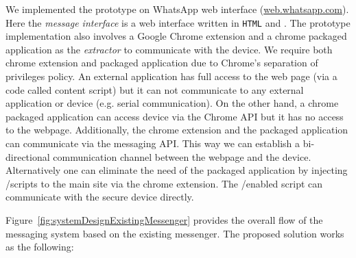 We implemented the prototype on WhatsApp web interface (\url{web.whatsapp.com}). Here the \emph{message interface} is a web interface written in \texttt{HTML} and \js. The prototype implementation also involves a Google Chrome extension and a chrome packaged application as the \emph{extractor} to communicate with the \usb device. We require both chrome extension and packaged application due to Chrome's separation of privileges policy. An external application has full access to the web page (via a \js code called content script) but it can not communicate to any external application or device (e.g. serial communication). On the other hand, a chrome packaged application can access \usb device via the Chrome \serial API but it has no access to the webpage. Additionally, the chrome extension and the packaged application can communicate via the messaging API. This way we can establish a bi-directional communication channel between the webpage and the \usb device. Alternatively one can eliminate the need of the packaged application by injecting \webusb/\webbt scripts to the main site via the chrome extension. The \webusb/\webbt enabled script can communicate with the secure \usb device directly.

Figure~\ref{fig:systemDesignExistingMessenger} provides the overall flow of the messaging system based on the existing messenger. The proposed solution works as the following:

